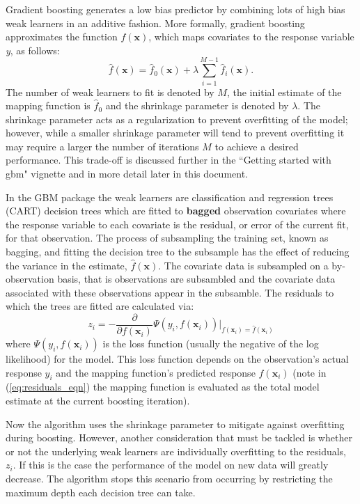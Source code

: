 \documentclass{article}
\begin{document}
Gradient boosting generates a low bias predictor by combining lots of high bias weak learners in an additive fashion. More formally, gradient boosting approximates the function $f(\textbf{x})$, which maps covariates to the response variable \textit{y}, as follows:
\begin{equation}
\label{eq:boosting_eqn}
\hat{f}(\mathbf{x}) = \hat{f}_{0}(\mathbf{x}) + \lambda \sum_{i=1}^{M-1} \hat{f}_{i}(\mathbf{x}).
\end{equation}
The number of weak learners to fit is denoted by $M$, the initial estimate of the mapping function is $\hat{f}_0$ and the shrinkage parameter is denoted by $\lambda$.  The shrinkage parameter acts as a regularization to prevent overfitting of the model; however, while a smaller shrinkage parameter will tend to prevent overfitting it may require a larger the number of iterations $M$ to achieve a desired performance.  This trade-off is discussed further in the ``Getting started with gbm" vignette and in more detail later in this document.

In the GBM package the weak learners are classification and regression trees (CART) decision trees which are fitted to \textbf{bagged} observation covariates where the response variable to each covariate is the residual, or error of the current fit, for that observation. The process of subsampling the training set, known as bagging, and fitting the decision tree to the subsample has the effect of reducing the variance in the estimate, $\hat{f}(\mathbf{x})$.  The covariate data is subsampled on a by-observation basis, that is observations are subsambled and the covariate data associated with these observations appear in the subsamble. The residuals to which the trees are fitted are calculated via:
\begin{equation}
\label{eq:residuals_eqn}
z_{i} = -\frac{\partial}{\partial f(\mathbf{x}_i)}\Psi(y_{i},f(\mathbf{x}_i))|_{f(\mathbf{x}_i) = \hat{f}(\mathbf{x}_i)}
\end{equation}
where $\Psi(y_i, f(\mathbf{x}_i))$ is the loss function (usually the negative of the log likelihood) for the model. This loss function depends on the observation's actual response $y_i$ and the mapping function's predicted response $f(\mathbf{x}_i)$ (note in (\ref{eq:residuals_eqn}) the mapping function is evaluated as the total model estimate at the current boosting iteration).

Now the algorithm uses the shrinkage parameter to mitigate against overfitting during boosting. However, another consideration that must be tackled is whether or not the underlying weak learners are individually overfitting to the residuals, $z_i$.  If this is the case the performance of the model on new data will greatly decrease.  The algorithm stops this scenario from occurring by restricting the maximum depth each decision tree can take. 
\end{document}
